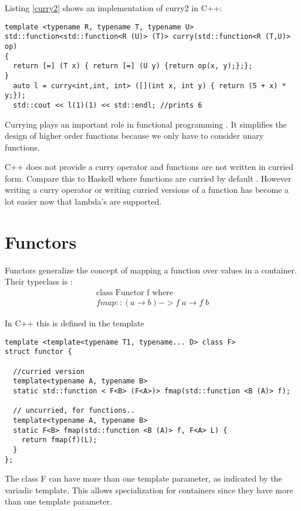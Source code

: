 \documentclass[12pt,fleqn]{article}
\begin{document}
Listing \ref{curry2} shows an implementation of curry2 in C++: 
\begin{lstlisting}[caption=curry for binary operators, label=curry2]
template <typename R, typename T, typename U>
std::function<std::function<R (U)> (T)> curry(std::function<R (T,U)> op)
{
  return [=] (T x) { return [=] (U y) {return op(x, y);};};
}
  auto l = curry<int,int, int> ([](int x, int y) { return (5 + x) * y;});
  std::cout << l(1)(1) << std::endl; //prints 6
\end{lstlisting}
Currying plays an important role in functional programming \cite{field}. 
It simplifies the design of higher order functions because we only have to consider unary functions.

C++ does not provide a curry operator and functions are not written in curried form. 
Compare this to Haskell where functions are curried by default \cite{lipovaca, hutton}.
However writing a curry operator or writing curried versions of a function has become a lot easier now that lambda's are supported.

\section*{Functors}

Functors generalize the concept of mapping a function over values in a container.
Their typeclass is :
\begin{eqnarray*}
\mbox{class Functor f where} \\
fmap :: (a \rightarrow b) -> f\;a \rightarrow f\;b
\end{eqnarray*}

In C++ this is defined in the template 
\begin{lstlisting}
template <template<typename T1, typename... D> class F>
struct functor {

  //curried version
  template<typename A, typename B>
  static std::function < F<B> (F<A>)> fmap(std::function <B (A)> f);

  // uncurried, for functions..
  template<typename A, typename B>
  static F<B> fmap(std::function <B (A)> f, F<A> L) {
    return fmap(f)(L);
  }
};
\end{lstlisting}
The class F can have more than one template parameter, as indicated by the variadic template.
This allows specialization for containers since they have more than one template parameter.
\end{document}
